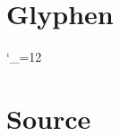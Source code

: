 \documentclass{fontdoku}
\begin{document}
%
%
%
%
%
%
%
%
%
%
%
%


\newpage
\section{Glyphen}

\setlength{\columnseprule}{.5pt}
\setlength{\columnsep}{1cm}
\begin{multicols}{3}
   \newcommand{\GYLPHNAME}[1]{#1\hfill{\Huge\libertineGlyph{#1}\strut}\newline}
   \catcode`\_=12%
\end{multicols}



\newpage
\section{Source}


\end{document}
